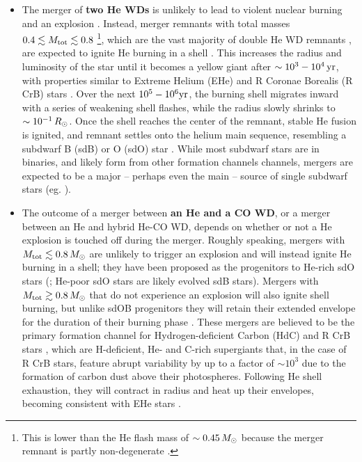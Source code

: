 
\begin{itemize}
	\item The merger of {\bf two He WDs} is unlikely to lead to violent nuclear burning and an explosion \citep{dan+12,dan+14,dan+15}.  Instead, merger remnants with total masses $0.4\lesssim \Mtot \lesssim 0.8$ \citep{han+02,pacz71}\footnote{This is lower than the He flash mass of $\sim0.45\,\Msun$ because the merger remnant is partly non-degenerate \citep{han+02}.}, which are the vast majority of double He WD remnants \citep{nele10}, are expected to ignite He burning in a shell \citep{saioj00,zhanj12}.  This increases the radius and luminosity of the star until it becomes a yellow giant after $\sim 10^3-10^4\,\mathrm{yr}$, with properties similar to Extreme Helium (EHe) and R Coronae Borealis (R CrB) stars {\charles \citep{saioj00, zhanj12}.}  Over the next $10^5-10^6\mathrm{yr}$, the burning shell migrates inward with a series of weakening shell flashes, while the radius slowly shrinks to $\sim10^{-1}\,\Rsun$.  Once the shell reaches the center of the remnant, stable He fusion is ignited, and remnant settles onto the helium main sequence, resembling a subdwarf B (sdB) or O (sdO) star \citep{saioj00, justph11, zhanj12}.  While most subdwarf stars are in binaries, and likely form from other formation channels channels, mergers are expected to be a major -- perhaps even the main -- source of single subdwarf stars (eg. \citealt{han+03, nele10}).

	\item The outcome of a merger between {\bf an He and a CO WD}, or a merger between an He and hybrid He-CO WD, depends on whether or not a He explosion is touched off during the merger.  Roughly speaking, mergers with $\Mtot \lesssim 0.8\,\Msun$ are unlikely to trigger an explosion \citep{dan+12, dan+14} and will instead ignite He burning in a shell; they have been proposed as the progenitors to He-rich sdO stars (\citealt{justph11}; He-poor sdO stars are likely evolved sdB stars).  Mergers with $\Mtot \gtrsim 0.8\,\Msun$ that do not experience an explosion will also ignite shell burning, but unlike sdOB progenitors they will retain their extended envelope for the duration of their burning phase \citep{pacz71}.  These mergers are believed to be the primary formation channel for Hydrogen-deficient Carbon (HdC) and R CrB stars \citep{webb84, ibent84, saioj02, clay12, kararh15}, which are H-deficient, He- and C-rich supergiants that, in the case of R CrB stars, feature abrupt variability by up to a factor of $\sim10^3$ due to the formation of carbon dust above their photospheres.  Following He shell exhaustion, they will contract in radius and heat up their envelopes, becoming consistent with EHe stars \cite{saioj02, jeff14}.


\end{itemize}
